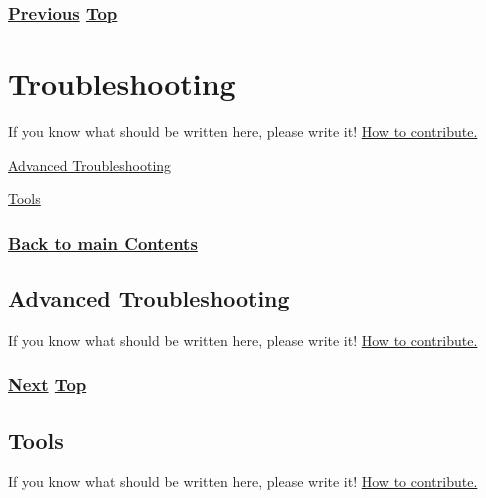 \documentclass[
]{article}
\begin{document}
\subsubsection{\texorpdfstring{\hyperref[deployment-in-the-home]{Previous}
\hyperref[deployment-status]{Top}}{Previous Top}}\label{previous-top-5}

\pagebreak

\section{Troubleshooting}\label{troubleshooting}

If you know what should be written here, please write it!
\href{https://github.com/becarpenter/book6/blob/main/1.\%20Introduction\%20and\%20Foreword/How\%20to\%20contribute.md\#how-to-contribute}{How
to contribute.}

\hyperref[advanced-troubleshooting]{Advanced Troubleshooting}

\hyperref[tools]{Tools}

\subsubsection{\texorpdfstring{\hyperref[list-of-contents]{Back to main
Contents}}{Back to main Contents}}\label{back-to-main-contents-8}

\pagebreak

\subsection{Advanced Troubleshooting}\label{advanced-troubleshooting}

If you know what should be written here, please write it!
\href{https://github.com/becarpenter/book6/blob/main/1.\%20Introduction\%20and\%20Foreword/How\%20to\%20contribute.md\#how-to-contribute}{How
to contribute.}

\subsubsection{\texorpdfstring{\hyperref[tools]{Next}
\hyperref[troubleshooting]{Top}}{Next Top}}\label{next-top-6}

\pagebreak

\subsection{Tools}\label{tools}

If you know what should be written here, please write it!
\href{https://github.com/becarpenter/book6/blob/main/1.\%20Introduction\%20and\%20Foreword/How\%20to\%20contribute.md\#how-to-contribute}{How
to contribute.}
\end{document}
